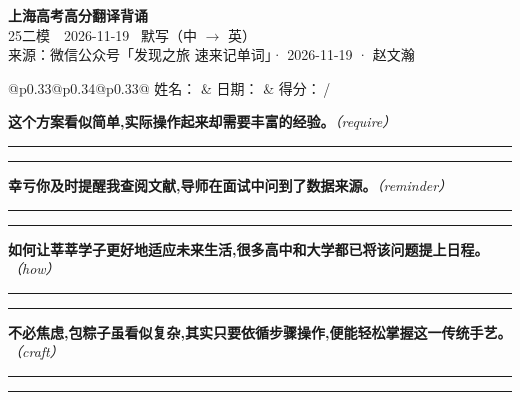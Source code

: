 \documentclass[11pt,a4paper]{article}
\newcommand{\num}[1]{\makebox[1.9em][r]{#1.}\hspace{0.3em}}
\newcommand{\wline}{\noindent\rule{\linewidth}{0.4pt}}
\newcommand{\prompt}[1]{\emph{\textcolor{tipblue}{\small（#1）}}}
\begin{document}
\pagestyle{plain}
\begin{center}
{\LARGE\bfseries 上海高考高分翻译背诵 }\\[0.25em]
{\large 25二模　2026-11-19 \quad\ 默写（中 $\to$ 英）}\\[0.35em]
{\footnotesize 来源：微信公众号「发现之旅 速来记单词」· 2026-11-19 · 赵文瀚}
\end{center}

\vspace{0.4em}
\noindent\begin{tabular}{@{}p{0.33\textwidth}@{}p{0.34\textwidth}@{}p{0.33\textwidth}@{}}
姓名：\underline{\hspace{2.0cm}} & 日期：\underline{\hspace{2.0cm}} & 得分：\underline{\hspace{1.4cm}}\,/ \\
\end{tabular}

\vspace{0.5em}

\vspace{0.8em}
\num{1}\textbf{这个方案看似简单,实际操作起来却需要丰富的经验。}\prompt{require}

\vspace{0.3em}

\wline\vspace{0.3em}
\wline

\num{2}\textbf{幸亏你及时提醒我查阅文献,导师在面试中问到了数据来源。}\prompt{reminder}

\vspace{0.3em}

\wline\vspace{0.3em}
\wline

\num{3}\textbf{如何让莘莘学子更好地适应未来生活,很多高中和大学都已将该问题提上日程。}\prompt{how}

\vspace{0.3em}

\wline\vspace{0.3em}
\wline

\num{4}\textbf{不必焦虑,包粽子虽看似复杂,其实只要依循步骤操作,便能轻松掌握这一传统手艺。}\prompt{craft}

\vspace{0.3em}

\wline\vspace{0.3em}
\wline
\end{document}
